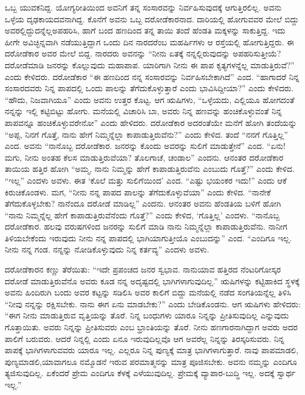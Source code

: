 ಒಬ್ಬ ಯುವಕನಿದ್ದ. ಯೋಗ್ಯರೀತಿಯಿಂದ ಅವನಿಗೆ ತನ್ನ ಸಂಸಾರವನ್ನು ನಿರ್ವಹಿಸುವುದಕ್ಕೆ ಆಗುತ್ತಿರಲಿಲ್ಲ. ಅವನು ಒಳ್ಳೆಯ ದೃಢಕಾಯದವನಾಗಿದ್ದ. ಕೊನೆಗೆ ಅವನು ಒಬ್ಬ ದರೋಡೆಕಾರನಾದ. ದಾರಿಯಲ್ಲಿ ಹೋಗುವವರ ಮೇಲೆ ಬಿದ್ದು ಅವರಲ್ಲಿದ್ದುದನ್ನೆಲ್ಲ\break ಅಪಹರಿಸಿ, ಹಾಗೆ ಬಂದ ಹಣದಿಂದ ತನ್ನ ತಾಯಿ ತಂದೆ ಹೆಂಡತಿ ಮಕ್ಕಳನ್ನು ಸಾಕುತ್ತಿದ್ದ. ಇದು ಹೀಗೇ ಅವಿಚ್ಛಿನ್ನವಾಗಿ ನಡೆಯುತ್ತಿದ್ದಾಗ ಒಂದು ದಿನ ನಾರದರೆಂಬ ಮಹರ್ಷಿಗಳು ಆ ರಸ್ತೆಯಲ್ಲಿ ಹೋಗುತ್ತಿದ್ದರು. ಈ ದರೋಡೆಕಾರ ಅವರ ಮೇಲೆ ಬಿದ್ದ. ನಾರದರು ಅವನನ್ನು “ನೀನು ಏತಕ್ಕೆ ನನ್ನಲ್ಲಿರುವುದನ್ನು ಅಪಹರಿಸುತ್ತೀಯೆ? ದರೋಡೆಮಾಡಿ ಜನರನ್ನು ಕೊಲ್ಲುವುದು ಮಹಾಪಾಪ. ಯಾರಿಗಾಗಿ ನೀನು ಈ ಪಾಪ ಕೃತ್ಯಗಳನ್ನೆಲ್ಲ ಮಾಡುತ್ತಿರುವೆ?” ಎಂದು ಕೇಳಿದರು. ದರೋಡೆಕಾರ “ಈ ಹಣದಿಂದ ನನ್ನ ಸಂಸಾರವನ್ನು ನಿರ್ವಹಿಸಬೇಕಾಗಿದೆ” ಎಂದ. “ಹಾಗಾದರೆ ನಿನ್ನ ಸಂಸಾರದವರು ನಿನ್ನ ಪಾಪದಲ್ಲಿ ಒಂದು ಪಾಲನ್ನು ತೆಗೆದುಕೊಳ್ಳುತ್ತಾರೆ ಎಂದು ಭಾವಿಸಿದ್ದೀಯಾ?” ಎಂದು ಕೇಳಿದರು. “ಹೌದು, ನಿಜವಾಗಿಯೂ” ಎಂದು ಅವನು ಉತ್ತರ ಕೊಟ್ಟ. ಆಗ ಋಷಿಗಳು, “ಒಳ್ಳೆಯದು, ಎಲ್ಲಿಯೂ ಹೋಗದಂತೆ ನನ್ನನ್ನು ಇಲ್ಲಿ ಕಟ್ಟಿಬಿಟ್ಟು ಹೋಗು. ಮನೆಯಲ್ಲಿ ವಿಚಾರಿಸಿ ಬಾ, ಅವರು ನಿನ್ನ ಹಣವನ್ನು ಹಂಚಿಕೊಳ್ಳುವಂತೆ ನಿನ್ನ ಪಾಪವನ್ನೂ ಹಂಚಿಕೊಳ್ಳುವರೇನೋ” ಎಂದು ಹೇಳಿದರು. ದರೋಡೆಕಾರ ಅದರಂತೆಯೇ ಮನೆಗೆ ಹೋಗಿ ತಂದೆಯನ್ನು “ಅಪ್ಪ, ನಿನಗೆ ಗೊತ್ತೆ, ನಾನು ಹೇಗೆ ನಿಮ್ಮನ್ನೆಲ್ಲಾ ಕಾಪಾಡುತ್ತಿರುವೆನು?” ಎಂದು ಕೇಳಿದ. ತಂದೆ “ನನಗೆ ಗೊತ್ತಿಲ್ಲ” ಎಂದ. ಅವನು “ನಾನೊಬ್ಬ ದರೋಡೆಕಾರ. ಜನರನ್ನು ಕೊಂದು ಅವರನ್ನು ಸುಲಿಗೆ ಮಾಡುತ್ತೇನೆ” ಎಂದ. “ಏನು! ಮಗು, ನೀನು ಅಂತಹ ಕೆಲಸ ಮಾಡುತ್ತಿರುವೆಯಾ? ತೊಲಗಾಚೆ, ಚಂಡಾಲ” ಎಂದನು. ಆನಂತರ ದರೋಡೆಕಾರ ತಾಯಿಯ ಹತ್ತಿರ ಹೋಗಿ “ಅಮ್ಮ, ನಾನು ನಿಮ್ಮನ್ನು ಹೇಗೆ ಕಾಪಾಡುತ್ತಿರುವೆನು ಎಂಬುದು ಗೊತ್ತೆ?” ಎಂದು ಕೇಳಿದ. “ಇಲ್ಲ” ಎಂದಳು ಅವಳು. ಈತ ‘ಕೊಲೆ ಮತ್ತು ಸುಲಿಗೆಯಿಂದ’ ಎಂದ. “ಎಷ್ಟು ಭಯಂಕರ ಇದು!” ಎಂದು ಆಕೆ ಕಿರುಚಿಕೊಂಡಳು. ಮಗ, “ನೀನು ನನ್ನ ಪಾಪದ ಪಾಲನ್ನು ತೆಗೆದುಕೊಳ್ಳುವೆಯಾ” ಎಂದು ಕೇಳಿದ. “ನಾನೇಕೆ ತೆಗೆದುಕೊಳ್ಳಬೇಕು? ನಾನೆಂದೂ ದರೋಡೆ ಮಾಡಿಲ್ಲ” ಎಂದನು. ಆನಂತರ ಅವನು ಹೆಂಡತಿಯ ಬಳಿಗೆ ಹೋಗಿ “ನಾನು ನಿಮ್ಮನ್ನೆಲ್ಲ ಹೇಗೆ ಕಾಪಾಡುತ್ತಿರುವೆನೆಂದು ಗೊತ್ತೆ?” ಎಂದು ಕೇಳಿದ, ‘ಗೊತ್ತಿಲ್ಲ’ ಎಂದಳು. “ನಾನೊಬ್ಬ ದರೋಡೆಕಾರ. ಹಲವು ವರುಷಗಳಿಂದ ಜನರನ್ನು ಸುಲಿಗೆ ಮಾಡಿ ನಾನು ನಿಮ್ಮನ್ನೆಲ್ಲಾ ಕಾಪಾಡುತ್ತಿರುವೆನು. ನಾನೀಗ ತಿಳಿಯಬೇಕೆಂದು ಇರುವುದು ನೀನು ನನ್ನ ಪಾಪದಲ್ಲಿ ಭಾಗಿಯಾಗುತ್ತೀಯೊ ಎಂಬುದನ್ನು” ಎಂದ. “ಎಂದಿಗೂ ಇಲ್ಲ. ನೀನು ನನ್ನ ಗಂಡ. ನನ್ನನ್ನು ನೋಡಿಕೊಳ್ಳುವುದು ನಿನ್ನ ಕರ್ತವ್ಯ” ಎಂದಳು ಅವಳು.

ದರೋಡೆಕಾರನ ಕಣ್ಣು ತೆರೆಯಿತು: “ಇದೇ ಪ್ರಪಂಚದ ಜನರ ಸ್ವಭಾವ. ನಾನು\break ಯಾವ ಹತ್ತಿರದ ನೆಂಟರಿಗೋಸ್ಕರ ದರೋಡೆ ಮಾಡುತ್ತಿರುವೆನೊ ಅವರು ಕೂಡ ನನ್ನ ಅದೃಷ್ಟದಲ್ಲಿ ಭಾಗಿಗಳಾಗುವುದಿಲ್ಲ.” ಋಷಿಗಳನ್ನು ಕಟ್ಟಿಹಾಕಿದ ಸ್ಥಳಕ್ಕೆ ಅವನು ಹಿಂದಿರುಗಿ ಬಂದು ಅವರ ಕಟ್ಟನ್ನು ಸಡಿಲಿಸಿ ಅವರ ಕಾಲಿಗೆ ಬಿದ್ದು ಮನೆಯಲ್ಲಿ ನಡೆದ ಸಂಗತಿಯನ್ನೆಲ್ಲ ತಿಳಿಸಿ “ನೀವು ನನ್ನನ್ನು ರಕ್ಷಿಸಬೇಕು. ನಾನು ಈಗ ಏನು ಮಾಡಬೇಕು?” ಎಂದು ಬೇಡಿಕೊಂಡನು. ಆಗ ಋಷಿಗಳು ಹೇಳಿದರು: “ಈಗ ನೀನು ಮಾಡುತ್ತಿರುವ ವೃತ್ತಿಯನ್ನು ತೊರೆ. ನಿನ್ನ ಬಂಧುಗಳು ಯಾರೂ ನಿನ್ನನ್ನು ಪ್ರೀತಿಸುವುದಿಲ್ಲ ಎನ್ನುವುದು ಗೊತ್ತಾಯಿತು. ಅವರು ನಿನ್ನನ್ನು ಪ್ರೀತಿಸುವರು ಎಂಬ ಭ್ರಾಂತಿಯನ್ನು ತೊರೆ. ನೀನು ಹಣಗಾರನಾಗಿದ್ದಾಗ ಅವರು ಅದರ ಪಾಲಿಗೆ ಬರುವರು. ಆದರೆ ನಿನ್ನಲ್ಲಿ ಎಂದು ಏನೂ ಇರುವುದಿಲ್ಲವೊ ಆಗ ಅವರೆಲ್ಲ ನಿನ್ನನ್ನು ತಿರಸ್ಕರಿಸುವರು. ನಿನ್ನ ಪಾಪಕ್ಕೆ ಭಾಗಿಗಳಾಗುವವರು ಯಾರೂ ಇಲ್ಲ. ಎಲ್ಲರೂ ನಿನ್ನ ಪುಣ್ಯಕ್ಕೆ ಮಾತ್ರ ಭಾಗಿಗಳಾಗುತ್ತಾರೆ. ನಾವು ಪಾಪಮಾಡಲಿ, ಪುಣ್ಯಮಾಡಲಿ,\break ಯಾವಾಗಲೂ ನಮ್ಮೊಡನೆ ಇರುವ ಪರಮಾತ್ಮನನ್ನು ಮಾತ್ರ ಪೂಜಿಸಬೇಕು. ಅವನು ನಮ್ಮನ್ನು ಎಂದಿಗೂ ತ್ಯಜಿಸುವುದಿಲ್ಲ. ಏಕೆಂದರೆ ಪ್ರೇಮ ಎಂದಿಗೂ ಕೆಳಕ್ಕೆ ಎಳೆಯುವುದಿಲ್ಲ. ಪ್ರೇಮಕ್ಕೆ ವ್ಯಾಪಾರ-ಬುದ್ಧಿ ಇಲ್ಲ. ಅದಕ್ಕೆ ಸ್ವಾರ್ಥ ಇಲ್ಲ.”

